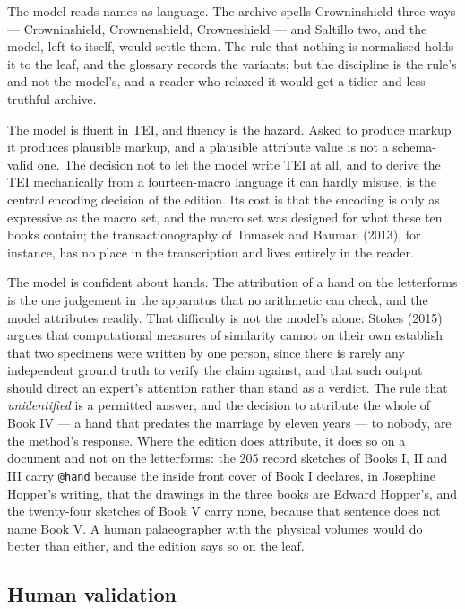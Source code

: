 \documentclass[11pt]{article}
\begin{document}
The model reads names as language. The archive spells Crowninshield three ways — Crowninshield, Crownenshield, Crowneshield — and Saltillo two, and the model, left to itself, would settle them. The rule that nothing is normalised holds it to the leaf, and the glossary records the variants; but the discipline is the rule's and not the model's, and a reader who relaxed it would get a tidier and less truthful archive.

The model is fluent in TEI, and fluency is the hazard. Asked to produce markup it produces plausible markup, and a plausible attribute value is not a schema-valid one. The decision not to let the model write TEI at all, and to derive the TEI mechanically from a fourteen-macro language it can hardly misuse, is the central encoding decision of the edition. Its cost is that the encoding is only as expressive as the macro set, and the macro set was designed for what these ten books contain; the transactionography of Tomasek and Bauman (2013), for instance, has no place in the transcription and lives entirely in the reader.

The model is confident about hands. The attribution of a hand on the letterforms is the one judgement in the apparatus that no arithmetic can check, and the model attributes readily. That difficulty is not the model's alone: Stokes (2015) argues that computational measures of similarity cannot on their own establish that two specimens were written by one person, since there is rarely any independent ground truth to verify the claim against, and that such output should direct an expert's attention rather than stand as a verdict. The rule that \emph{unidentified} is a permitted answer, and the decision to attribute the whole of Book IV --- a hand that predates the marriage by eleven years --- to nobody, are the method's response. Where the edition does attribute, it does so on a document and not on the letterforms: the 205 record sketches of Books I, II and III carry \texttt{@hand} because the inside front cover of Book I declares, in Josephine Hopper's writing, that the drawings in the three books are Edward Hopper's, and the twenty-four sketches of Book V carry none, because that sentence does not name Book V. A human palaeographer with the physical volumes would do better than either, and the edition says so on the leaf.

\subsection{Human validation}
\end{document}
